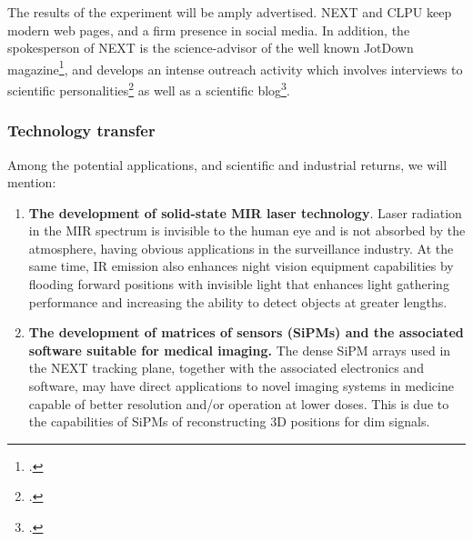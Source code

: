 The results of the experiment will be amply advertised. NEXT and CLPU keep modern web pages, and a firm presence in social media. In addition, the spokesperson of NEXT is the science-advisor of the well known JotDown magazine\footcite{JotDown}, and develops an intense outreach activity which involves interviews to scientific personalities\footcite{JotDownNygrenBettini, JotDownCattaiGonzalez, JotDownHalzen} as well as a scientific blog\footcite{JotDownBlog}.

\subsubsection*{Technology transfer}

Among the potential applications, and scientific and industrial returns, we will mention:
\begin{enumerate}
\item {\bf The development of solid-state MIR laser technology}. Laser radiation in the MIR spectrum is invisible to the human eye and is not absorbed by the atmosphere, having obvious applications in the surveillance industry. At the same time, IR emission also enhances night vision equipment capabilities by flooding forward positions with invisible light that enhances light gathering performance and increasing the ability to detect objects at greater lengths. 
\item {\bf The development of matrices of sensors (SiPMs) and the associated software suitable for medical imaging.} The dense SiPM arrays used in the NEXT tracking plane, together with the associated electronics and software, may have direct applications to novel imaging systems in medicine capable of better resolution and/or operation at lower doses. This is due to the capabilities of SiPMs of reconstructing 3D positions for dim signals. 
\end{enumerate}